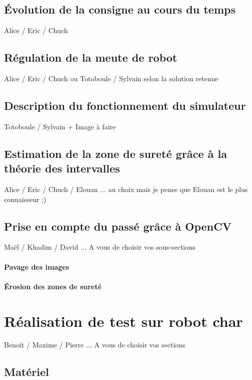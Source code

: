 \documentclass[10pt,a4paper]{report}
\begin{document}
\section{Évolution de la consigne au cours du temps}

Alice / Eric / Chuch

\section{Régulation de la meute de robot}

Alice / Eric / Chuch ou Totoboule / Sylvain selon la solution retenue

\section{Description du fonctionnement du simulateur}

Totoboule / Sylvain + Image à faire

\section{Estimation de la zone de sureté grâce à la théorie des intervalles}

Alice / Eric / Chuch / Elouan ... au choix mais je pense que Elouan est le plus connaisseur ;)


\section{Prise en compte du passé grâce à OpenCV}

Maël / Khadim / David  ... A vous de choisir vos sous-sections

\subsubsection{Pavage des images}

\subsubsection{Érosion des zones de sureté}


\chapter{Réalisation de test sur robot char}
Benoit / Maxime / Pierre ... A vous de choisir vos sections
\section{Matériel}
\end{document}

